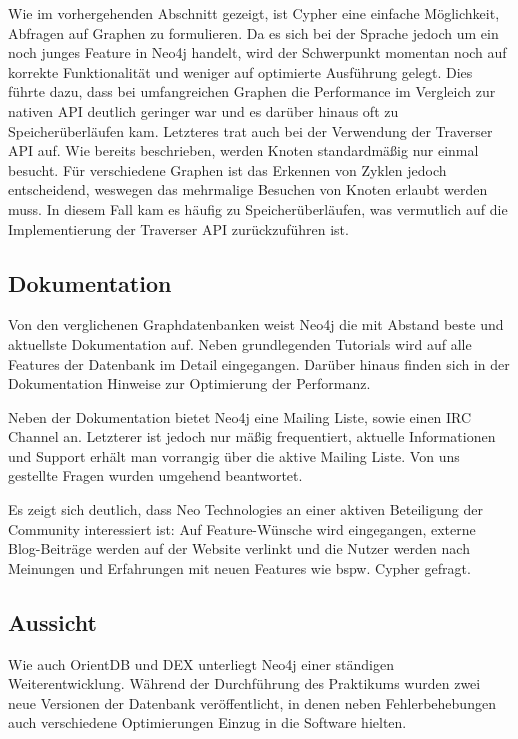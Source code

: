 \documentclass[11pt, a4paper, oneside]{article} %
\begin{document}
Wie im vorhergehenden Abschnitt gezeigt, ist Cypher eine einfache Möglichkeit, Abfragen auf Graphen zu formulieren. Da es sich bei der Sprache jedoch um ein noch junges Feature in Neo4j handelt, wird der Schwerpunkt momentan noch auf korrekte Funktionalität und weniger auf optimierte Ausführung gelegt. Dies führte dazu, dass bei umfangreichen Graphen die Performance im Vergleich zur nativen API deutlich geringer war und es darüber hinaus oft zu Speicherüberläufen kam. Letzteres trat auch bei der Verwendung der Traverser API auf. Wie bereits beschrieben, werden Knoten standardmäßig nur einmal besucht. Für verschiedene Graphen ist das Erkennen von Zyklen jedoch entscheidend, weswegen das mehrmalige Besuchen von Knoten erlaubt werden muss. In diesem Fall kam es häufig zu Speicherüberläufen, was vermutlich auf die Implementierung der Traverser API zurückzuführen ist.

\subsection{Dokumentation}

Von den verglichenen Graphdatenbanken weist Neo4j die mit Abstand beste und aktuellste Dokumentation auf. Neben grundlegenden Tutorials wird auf alle Features der Datenbank im Detail eingegangen. Darüber hinaus finden sich in der Dokumentation Hinweise zur Optimierung der Performanz.

Neben der Dokumentation bietet Neo4j eine Mailing Liste, sowie einen IRC Channel an. Letzterer ist jedoch nur mäßig frequentiert, aktuelle Informationen und Support erhält man vorrangig über die aktive Mailing Liste. Von uns gestellte Fragen wurden umgehend beantwortet.

Es zeigt sich deutlich, dass Neo Technologies an einer aktiven Beteiligung der Community interessiert ist: Auf Feature-Wünsche wird eingegangen, externe Blog-Beiträge werden auf der Website verlinkt und die Nutzer werden nach Meinungen und Erfahrungen mit neuen Features wie bspw. Cypher gefragt.

\subsection{Aussicht}

Wie auch OrientDB und DEX unterliegt Neo4j einer ständigen Weiterentwicklung. Während der Durchführung des Praktikums wurden zwei neue Versionen der Datenbank veröffentlicht, in denen neben Fehlerbehebungen auch verschiedene Optimierungen Einzug in die Software hielten.
\end{document}
